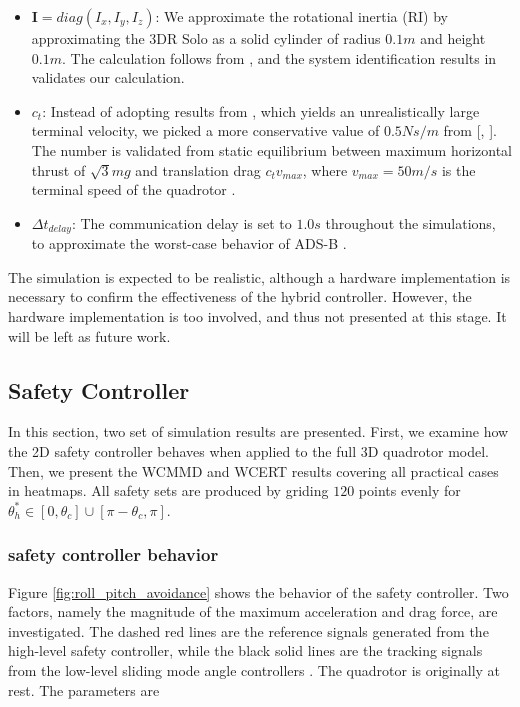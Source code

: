 \documentclass[journal,11pt,onecolumn,draftclsnofoot,]{IEEEtran}
\begin{document}
\begin{itemize}
	\item $\boldsymbol{I}=diag(I_x,I_y,I_z)$: We approximate the rotational inertia (RI) by approximating the 3DR Solo as a solid cylinder of radius $0.1m$ and height $0.1m$. The calculation follows from \cite{beer1972statics}, and the system identification results in \cite{bouadi2011adaptive} validates our calculation.
	
	\item $c_t$: Instead of adopting results from \cite{bouadi2011adaptive}, which yields an unrealistically large terminal velocity, we picked a more conservative value of $0.5 Ns/m$ from [, ]. The number is validated from static equilibrium between maximum horizontal thrust of $\sqrt{3}mg$ and translation drag $c_t v_{max}$, where $v_{max}=50m/s$ is the terminal speed of the quadrotor \cite{quadrotor_common_speed}.
	
	\item $\Delta t_{delay}$: The communication delay is set to $1.0 s$ throughout the simulations, to approximate the worst-case behavior of ADS-B \cite{helfrick2010principles}.
\end{itemize}

The simulation is expected to be realistic, although a hardware implementation is necessary to confirm the effectiveness of the hybrid controller. However, the hardware implementation is too involved, and thus not presented at this stage. It will be left as future work.

\subsection{Safety Controller} \label{sec:safety_controller_result}

In this section, two set of simulation results are presented. First, we examine how the 2D safety controller behaves when applied to the full 3D quadrotor model. Then, we present the WCMMD and WCERT results covering all practical cases in heatmaps. All safety sets are produced by griding $120$ points evenly for $\theta_h^*\in[0,\theta_c] \cup [\pi-\theta_c,\pi]$.

\subsubsection{safety controller behavior}

Figure \ref{fig:roll_pitch_avoidance} shows the behavior of the safety controller. Two factors, namely the magnitude of the maximum acceleration and drag force, are investigated. The dashed red lines are the reference signals generated from the high-level safety controller, while the black solid lines are the tracking signals from the low-level sliding mode angle controllers \cite{bouadi2011adaptive}. The quadrotor is originally at rest. The parameters are
\end{document}
